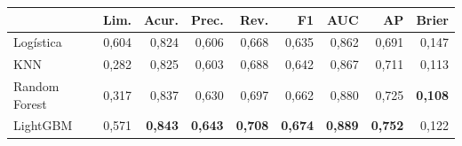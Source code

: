 \begin{tabular}{lrrrrrrrr}
\toprule
 & Lim. & Acur. & Prec. & Rev. & F1 & AUC & AP & Brier \\
\midrule
Logística & 0,604 & 0,824 & 0,606 & 0,668 & 0,635 & 0,862 & 0,691 & 0,147 \\
KNN & 0,282 & 0,825 & 0,603 & 0,688 & 0,642 & 0,867 & 0,711 & 0,113 \\
Random Forest & 0,317 & 0,837 & 0,630 & 0,697 & 0,662 & 0,880 & 0,725 & \textbf{0,108} \\
LightGBM & 0,571 & \textbf{0,843} & \textbf{0,643} & \textbf{0,708} & \textbf{0,674} & \textbf{0,889} & \textbf{0,752} & 0,122 \\
\bottomrule
\end{tabular}
